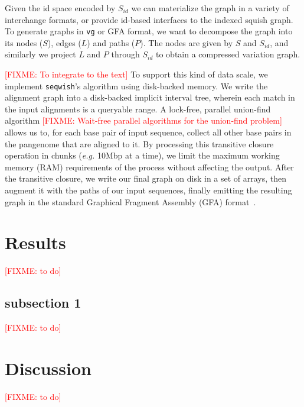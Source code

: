 \documentclass{bioinfo}
\newcommand{\red}[1]{{\textcolor{Red}{#1}}}
\newcommand{\FIXME}[1]{\red{[FIXME: #1]}}
\begin{document}
    Given the id space encoded by $S_{id}$ we can materialize the graph in a variety of interchange formats, or provide id-based interfaces to the indexed squish graph.
    To generate graphs in \texttt {vg} or GFA format, we want to decompose the graph into its nodes ($S$), edges ($L$) and paths ($P$).
    The nodes are given by $S$ and $S_{id}$, and similarly we project $L$ and $P$ through $S_{id}$ to obtain a compressed variation graph.

    \FIXME{To integrate to the text}
    To support this kind of data scale, we implement \texttt{seqwish}'s algorithm using disk-backed memory.
    We write the alignment graph into a disk-backed implicit interval tree, wherein each match in the input alignments is a queryable range.
    A lock-free, parallel union-find algorithm \FIXME{Wait-free parallel algorithms for the union-find problem} allows us to, for each base pair of input sequence, collect all other base pairs in the pangenome that are aligned to it.
    By processing this transitive closure operation in chunks (\textit{e.g.} 10Mbp at a time), we limit the maximum working memory (RAM) requirements of the process without affecting the output.
    After the transitive closure, we write our final graph on disk in a set of arrays, then augment it with the paths of our input sequences,
    finally emitting the resulting graph in the standard Graphical Fragment Assembly (GFA) format~\citep{GFA}.


    \section{Results}
    \label{sec:results}
    \FIXME{to do}


    \subsection{subsection 1}
    \label{subsec:subsec1}
    \FIXME{to do}


    \section{Discussion}
    \label{sec:discussion}
    \FIXME{to do}
\end{document}
